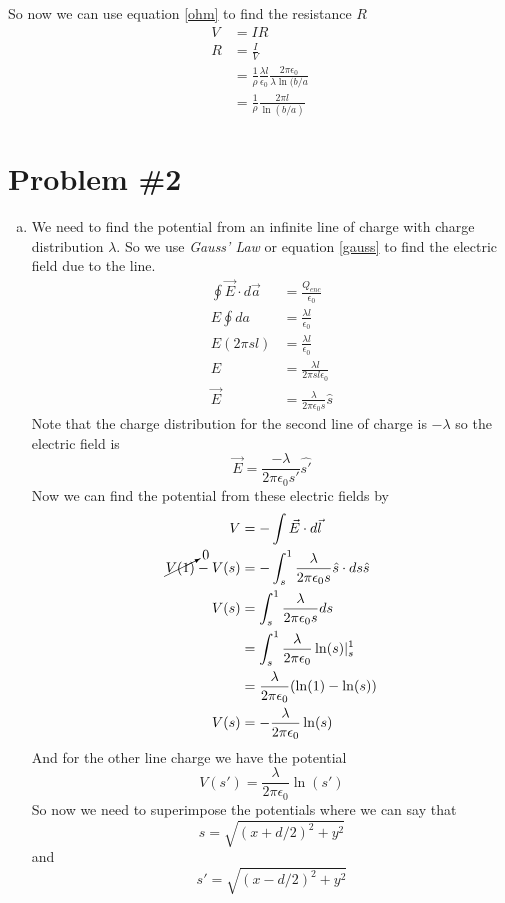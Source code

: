 \documentclass[11pt]{article}
\numberwithin{equation}{section}
\newcommand{\vecE}{\vec{E}}
\begin{document}
So now we can use equation \ref{ohm} to find the resistance $R$
\begin{align*}
V &= IR\\
R &= \frac{I}{V}\\
&= \frac{1}{\rho}\frac{\lambda l}{\epsilon_0}\frac{2\pi\epsilon_0}{\lambda\ln(b/a}\\
&= \frac{1}{\rho}\frac{2\pi l}{\ln(b/a)}
\end{align*}

\section{Problem \#2}
\begin{enumerate}[(a)]
\item
We need to find the potential from an infinite line of charge with charge distribution $\lambda$. So we use \emph{Gauss' Law} or equation \ref{gauss} to find the electric field due to the line.
\begin{align*}
\oint\vecE\cdot d\vec{a} &= \frac{Q_{enc}}{\epsilon_0}\\
E\oint da &= \frac{\lambda l}{\epsilon_0}\\
E(2\pi sl) &= \frac{\lambda l}{\epsilon_0}\\
E &= \frac{\lambda l}{2\pi sl\epsilon_0}\\
\vecE &= \frac{\lambda}{2\pi \epsilon_0 s}\hat{s}
\end{align*}
Note that the charge distribution for the second line of charge is $-\lambda$ so the electric field is
$$\vecE = \frac{-\lambda}{2\pi \epsilon_0 s'}\hat{s'}$$
Now we can find the potential from these electric fields by
\begin{align*}
V &= -\int\vecE\cdot d\vec{l}\\
\cancelto{0}{V(1)}-V(s) &= -\int_s^1\frac{\lambda}{2\pi \epsilon_0 s}\hat{s}\cdot ds\hat{s}\\
V(s) &= \int_s^1\frac{\lambda}{2\pi \epsilon_0 s} ds\\
&= \int_s^1\frac{\lambda}{2\pi \epsilon_0 }\ln(s)|_s^1 \\
&= \frac{\lambda}{2\pi \epsilon_0 }(\ln(1)-\ln(s)) \\
V(s) &= -\frac{\lambda}{2\pi \epsilon_0 }\ln(s) \\
\end{align*}
And for the other line charge we have the potential 
$$V(s') = \frac{\lambda}{2\pi \epsilon_0 }\ln(s')$$
So now we need to superimpose the potentials where we can say that
$$s = \sqrt{(x+d/2)^2+y^2}$$
and
$$s' = \sqrt{(x-d/2)^2+y^2}$$

\end{enumerate}
\end{document}
